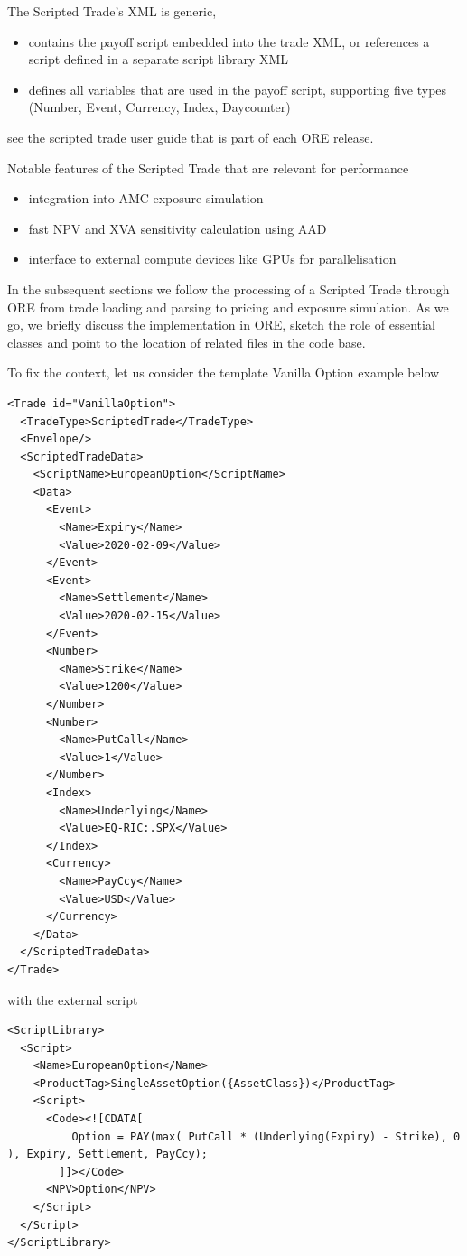 \documentclass[12pt, a4paper]{report}
\begin{document}
The Scripted Trade's XML is generic,
\begin{itemize}
\item contains the payoff script embedded into the trade XML, or references a script
  defined in a separate script library XML
\item defines all variables that are used in the payoff script, supporting five types
  (Number, Event, Currency, Index, Daycounter)
\end{itemize}
see the scripted trade user guide that is part of each ORE release.

Notable features of the Scripted Trade that are relevant for performance
\begin{itemize}
\item integration into AMC exposure simulation
\item fast NPV and XVA sensitivity calculation using AAD
\item interface to external compute devices like GPUs for parallelisation
\end{itemize}

In the subsequent sections we follow the processing of a Scripted Trade through ORE
from trade loading and parsing to pricing and exposure simulation. As we go, we briefly
discuss the implementation in ORE, sketch the role of essential classes and point to the
location of related files in the code base.

To fix the context, let us consider the template Vanilla Option example below

\begin{verbatim}
<Trade id="VanillaOption">
  <TradeType>ScriptedTrade</TradeType>
  <Envelope/>
  <ScriptedTradeData>
    <ScriptName>EuropeanOption</ScriptName>
    <Data>
      <Event>
        <Name>Expiry</Name>
        <Value>2020-02-09</Value>
      </Event>
      <Event>
        <Name>Settlement</Name>
        <Value>2020-02-15</Value>
      </Event>
      <Number>
        <Name>Strike</Name>
        <Value>1200</Value>
      </Number>
      <Number>
        <Name>PutCall</Name>
        <Value>1</Value>
      </Number>
      <Index>
        <Name>Underlying</Name>
        <Value>EQ-RIC:.SPX</Value>
      </Index>
      <Currency>
        <Name>PayCcy</Name>
        <Value>USD</Value>
      </Currency>
    </Data>
  </ScriptedTradeData>
</Trade>
\end{verbatim}

with the external script

\begin{verbatim}
<ScriptLibrary>
  <Script>
    <Name>EuropeanOption</Name>
    <ProductTag>SingleAssetOption({AssetClass})</ProductTag>
    <Script>
      <Code><![CDATA[
          Option = PAY(max( PutCall * (Underlying(Expiry) - Strike), 0 ), Expiry, Settlement, PayCcy);
        ]]></Code>
      <NPV>Option</NPV>
    </Script>
  </Script>
</ScriptLibrary>
\end{verbatim}
\end{document}
